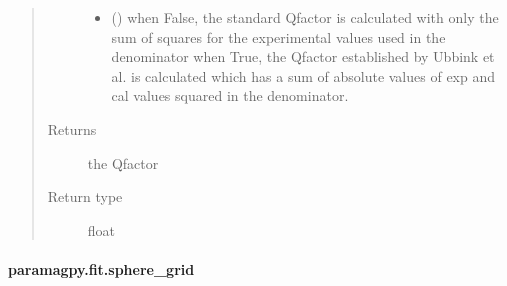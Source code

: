 \documentclass[a4paper,10pt,english,openany,oneside]{sphinxmanual}
\begin{document}
\begin{fulllineitems}
\begin{quote}
\begin{description}
\begin{itemize}
\item {} 
\sphinxAtStartPar
{} (\sphinxstyleliteralemphasis{\sphinxupquote{, }}) \textendash{} when False, the standard Q\sphinxhyphen{}factor is calculated with only the sum
of squares for the experimental values used in the denominator
when True, the Q\sphinxhyphen{}factor established by Ubbink et al. is
calculated which has a sum of absolute values of exp and cal
values squared in the denominator.

\end{itemize}

\item[{Returns}] \leavevmode
\sphinxAtStartPar
{} \textendash{} the Q\sphinxhyphen{}factor

\item[{Return type}] \leavevmode
\sphinxAtStartPar
float

\end{description}\end{quote}

\end{fulllineitems}



\paragraph{paramagpy.fit.sphere\_grid}
\label{\detokenize{reference/generated/paramagpy.fit.sphere_grid:paramagpy-fit-sphere-grid}}\label{\detokenize{reference/generated/paramagpy.fit.sphere_grid::doc}}
\end{document}
